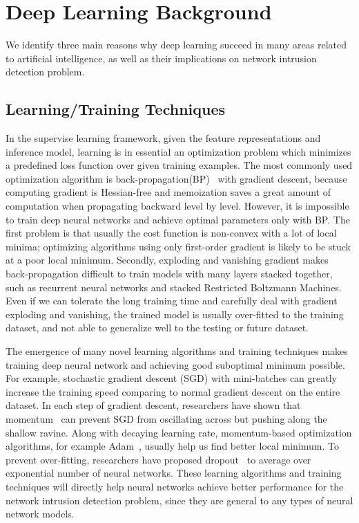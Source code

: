 \section{Deep Learning Background}
We identify three main reasons why deep learning succeed in many areas related
to artificial intelligence, as well as their implications on network intrusion detection problem.

\subsection{Learning/Training Techniques}
In the supervise learning framework, given the feature representations and inference model,
learning is in essential an optimization problem which minimizes a predefined loss function
over given training examples.
The most commonly used optimization algorithm is back-propagation(BP)~\cite{Backpropagation} with gradient descent,
because computing gradient is Hessian-free and memoization saves a great amount of computation when
propagating backward level by level.
However, it is impossible to train deep neural networks and achieve optimal parameters only with BP.
The first problem is that usually the cost function is non-convex with a lot of local minima;
optimizing algorithms using only first-order gradient is likely to be stuck at a poor local minimum.
Secondly, exploding and vanishing gradient makes back-propagation difficult to train models with many layers stacked together,
such as recurrent neural networks and stacked Restricted Boltzmann Machines.
Even if we can tolerate the long training time and carefully deal with gradient exploding and vanishing,
the trained model is usually over-fitted to the training dataset, and not able to generalize well to the testing or future dataset.

The emergence of many novel learning algorithms and training techniques makes training deep
neural network and achieving good suboptimal minimum possible.
For example, stochastic gradient descent (SGD) with mini-batches can greatly increase the training speed comparing
to normal gradient descent on the entire dataset.
In each step of gradient descent, researchers have shown that momentum~\cite{Momentum} can
prevent SGD from oscillating across but pushing along the shallow ravine.
Along with decaying learning rate, momentum-based optimization algorithms, for example Adam~\cite{Adam},
usually help us find better local minimum.
To prevent over-fitting, researchers have proposed dropout~\cite{Dropout} to average over
exponential number of neural networks.
These learning algorithms and training techniques will directly help neural networks achieve
better performance for the network intrusion detection problem,
since they are general to any types of neural network models.


